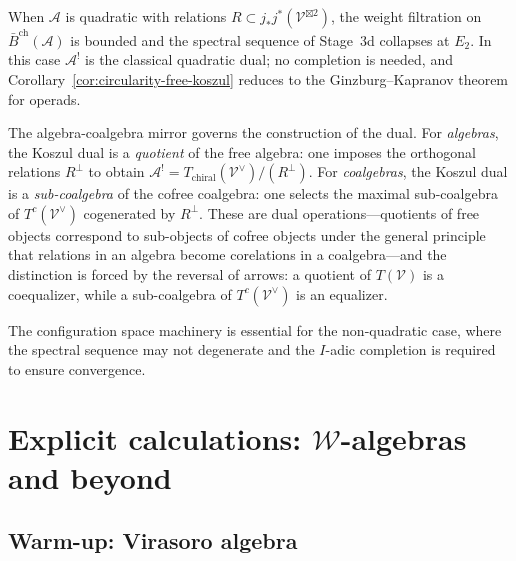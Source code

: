 \begin{remark}\label{rem:comparison-classical}
When $\mathcal{A}$ is quadratic with relations $R \subset j_*j^*(\mathcal{V}^{\boxtimes 2})$, the weight filtration on $\bar{B}^{\mathrm{ch}}(\mathcal{A})$ is bounded and the spectral sequence of Stage~3d collapses at $E_2$.  In this case $\mathcal{A}^!$ is the classical quadratic dual; no completion is needed, and Corollary~\ref{cor:circularity-free-koszul} reduces to the Ginzburg--Kapranov theorem for operads.

The algebra-coalgebra mirror governs the construction of the dual.  For \emph{algebras}, the Koszul dual is a \emph{quotient} of the free algebra: one imposes the orthogonal relations $R^{\perp}$ to obtain $\mathcal{A}^! = T_{\mathrm{chiral}}(\mathcal{V}^{\vee})/(R^{\perp})$.  For \emph{coalgebras}, the Koszul dual is a \emph{sub-coalgebra} of the cofree coalgebra: one selects the maximal sub-coalgebra of $T^c(\mathcal{V}^{\vee})$ cogenerated by $R^{\perp}$.  These are dual operations---quotients of free objects correspond to sub-objects of cofree objects under the general principle that relations in an algebra become corelations in a coalgebra---and the distinction is forced by the reversal of arrows: a quotient of $T(\mathcal{V})$ is a coequalizer, while a sub-coalgebra of $T^c(\mathcal{V}^{\vee})$ is an equalizer.

The configuration space machinery is essential for the non-quadratic case, where the spectral sequence may not degenerate and the $I$-adic completion is required to ensure convergence.
\end{remark}


\section{Explicit calculations: $\mathcal{W}$-algebras and beyond}
\label{sec:w-algebras-explicit-completion}


\subsection{Warm-up: Virasoro algebra}


